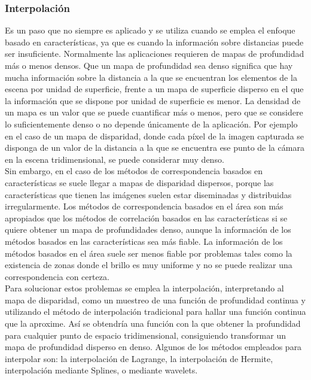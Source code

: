 \subsubsection{Interpolación}
Es un paso que no siempre es aplicado y se utiliza cuando se emplea el enfoque basado en características, ya que es cuando la información sobre distancias puede ser
insuficiente. Normalmente las aplicaciones requieren de mapas de profundidad más o
menos densos. Que un mapa de profundidad sea denso significa que hay mucha
información sobre la distancia a la que se encuentran los elementos de la escena por unidad de superficie, frente a un mapa de superficie disperso en el que la información que se dispone por unidad de superficie es menor. La densidad de un mapa es un valor que se puede cuantificar más o menos, pero que se considere lo suficientemente denso o no depende únicamente de la aplicación. Por ejemplo en el caso de un mapa de disparidad, donde cada píxel de la imagen capturada se disponga de un valor de la distancia a la que se encuentra ese punto de la cámara en la escena
tridimensional, se puede considerar muy denso.
\\
Sin embargo, en el caso de los métodos de correspondencia basados en características se suele llegar a mapas de disparidad dispersos, porque las características que tienen las imágenes suelen estar diseminadas y distribuidas irregularmente. Los métodos de correspondencia basados en el área son más apropiados que los métodos de correlación basados en las características si se quiere obtener un mapa de profundidades denso, aunque la información de los métodos basados en las características sea más fiable. La información de los métodos basados en el área suele ser menos fiable por problemas tales como la existencia de zonas donde el brillo es muy uniforme y no se puede realizar una correspondencia con certeza.
\\
Para solucionar estos problemas se emplea la interpolación, interpretando al mapa de disparidad, como un muestreo de una función de profundidad continua y utilizando el método de interpolación tradicional para hallar una función continua que la aproxime. Así se obtendría una función con la que obtener la profundidad para cualquier punto de espacio tridimensional, consiguiendo transformar un mapa de profundidad disperso en denso. Algunos de los métodos empleados para interpolar son: la interpolación de Lagrange, la interpolación de Hermite, interpolación mediante Splines, o mediante wavelets.
